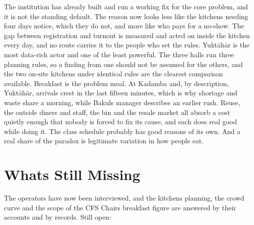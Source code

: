 \documentclass[
  10pt,
  table]{article}
\begin{document}
The institution has already built and run a working fix for the core problem, and it is not the standing default. The reason now looks less like the kitchens needing four days\textquotesingle{} notice, which they do not, and more like who pays for a no-show. The gap between registration and turnout is measured and acted on inside the kitchen every day, and no route carries it to the people who set the rules. Yuktāhār is the most data-rich actor and one of the least powerful. The three halls run three planning rules, so a finding from one should not be assumed for the others, and the two on-site kitchens under identical rules are the clearest comparison available. Breakfast is the problem meal. At Kadamba and, by description, Yuktāhār, arrivals crest in the last fifteen minutes, which is why shortage and waste share a morning, while Bakul\textquotesingle s manager describes an earlier rush. Reuse, the outside diners and staff, the bin and the resale market all absorb a cost quietly enough that nobody is forced to fix its cause, and each does real good while doing it. The class schedule probably has good reasons of its own. And a real share of the paradox is legitimate variation in how people eat.

\section{What\textquotesingle s Still Missing}\label{whats-still-missing}

The operators have now been interviewed, and the kitchens\textquotesingle{} planning, the crowd curve and the scope of the CFS Chair\textquotesingle s breakfast figure are answered by their accounts and by records. Still open:
\end{document}
